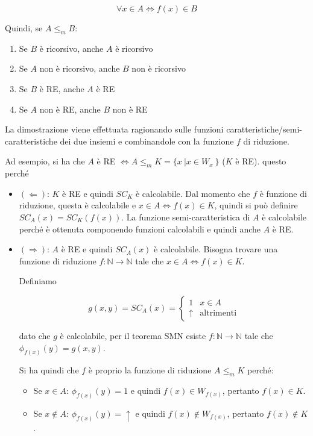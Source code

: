 $$
\forall x \in A \Leftrightarrow f(x) \in B
$$

Quindi, se $A \leq_m B$:

\begin{enumerate}
	\item Se $B$ è ricorsivo, anche $A$ è ricorsivo
	\item Se $A$ non è ricorsivo, anche $B$ non è ricorsivo
	\item Se $B$ è RE, anche $A$ è RE
	\item Se $A$ non è RE, anche $B$ non è RE
\end{enumerate}

La dimostrazione viene effettuata ragionando sulle funzioni caratteristiche/semi-caratteristiche dei due insiemi e combinandole con la funzione $f$ di riduzione.

Ad esempio, si ha che $A$ è RE $\Leftrightarrow A \leq_m K =  \{ x \: | x \in W_x\: \}$ ($K$ è RE). questo perché

\begin{itemize}
	\item $(\Leftarrow)$: $K$ è RE e quindi $SC_K$ è calcolabile. Dal momento che $f$ è funzione di riduzione, questa è calcolabile e $x \in A \Leftrightarrow f(x) \in K$, quindi si può definire $SC_A(x) = SC_K(f(x))$. La funzione semi-caratteristica di $A$ è calcolabile perché è ottenuta componendo funzioni calcolabili e quindi anche $A$ è RE.
	
	\item $(\Rightarrow)$: $A$ è RE e quindi $SC_A(x)$ è calcolabile. Bisogna trovare una funzione di riduzione $f : \mathbb{N} \rightarrow \mathbb{N}$  tale che  $x \in A \Leftrightarrow f(x) \in K$.
	
	Definiamo
	
	$$
	g(x,y) = SC_A(x) = \begin{cases}
	1& x \in A \\
	\uparrow &\text{altrimenti}
	\end{cases}
	$$ 
	
	dato che $g$ è calcolabile, per il teorema SMN esiste $f : \mathbb{N} \rightarrow \mathbb{N}$ tale che $\phi_{f(x)}(y)= g(x,y)$.
	
	Si ha quindi che $f$ è proprio la funzione di riduzione $A \leq_m K$ perché:
	
	\begin{itemize}
		\item Se $x \in A$: $\phi_{f(x)}(y) = 1$ e quindi $f(x) \in W_{f(x)}$, pertanto $f(x) \in K$.
		\item Se $x \notin A$: $\phi_{f(x)}(y) = \uparrow$ e quindi $f(x) \notin W_{f(x)}$, pertanto $f(x) \notin K$.
	\end{itemize}
\end{itemize}
 

